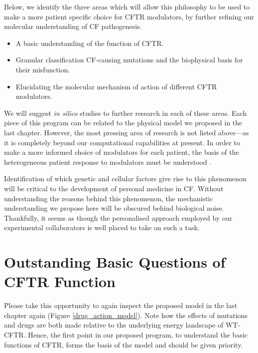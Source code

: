 Below, we identify the three areas which will allow this philosophy to be used to make a more patient specific choice for CFTR modulators, by further refining our molecular understanding of CF pathogenesis.

\begin{itemize}
	\item A basic understanding of the function of CFTR.
	\item Granular classification CF-causing mutations and the biophysical basis for their misfunction.
	\item Elucidating the molecular mechanism of action of different CFTR modulators. 
\end{itemize}

We will suggest \textit{in silico} studies to further research in each of these areas. Each piece of this program can be related to the physical model we proposed in the last chapter. However, the most pressing area of research is not listed above---as it is completely beyond our computational capabilities at present. In order to make a more informed choice of modulators for each patient, the basis of the heterogeneous patient response to modulators must be understood \cite{hanafin2021}. 

Identification of which genetic and cellular factors give rise to this phenomenon will be critical to the development of personal medicine in CF. Without understanding the reasons behind this phenomenon, the mechanistic understanding we propose here will be obscured behind biological noise. Thankfully, it seems as though the personalised approach employed by our experimental collaborators is well placed to take on such a task.

\section{Outstanding Basic Questions of CFTR Function}

Please take this opportunity to again inspect the proposed model in the last chapter again (Figure \ref{drug_action_model}). Note how the effects of mutations and drugs are both made relative to the underlying energy landscape of WT-CFTR. Hence, the first point in our proposed program, to understand the basic functions of CFTR, forms the basis of the model and should be given priority.


